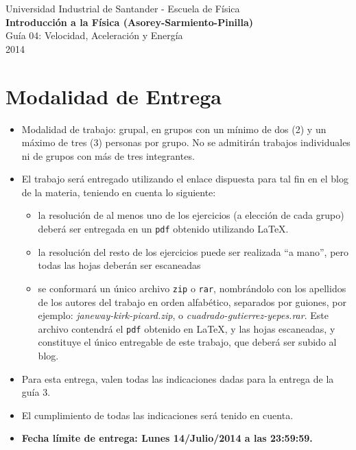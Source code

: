 \documentclass[a4paper,12pt]{article}
\begin{document}
\begin{center}
  {\small{Universidad Industrial de Santander - Escuela de Física}}\\
  {\bf{Introducción a la Física (Asorey-Sarmiento-Pinilla)}}\\
  \vspace{0.4cm}
  Guía 04: Velocidad, Aceleración y Energía\\ 2014
\end{center}

\renewcommand{\labelenumi}{\arabic{enumi})}
\renewcommand{\labelenumii}{\arabic{enumii})}

\section*{Modalidad de Entrega}

\begin{itemize}
\item Modalidad de trabajo: grupal, en grupos con un mínimo de dos (2) y un máximo de tres (3) personas por grupo. No se admitirán trabajos individuales ni de grupos con más de tres integrantes. 
\item El trabajo será entregado utilizando el enlace dispuesta para tal fin en el blog de la materia, teniendo en cuenta lo siguiente:
\begin{itemize}
  \item la resolución de al menos uno de los ejercicios (a elección de cada grupo) deberá ser entregada en un \texttt{pdf} obtenido utilizando \LaTeX.
  \item la resolución del resto de los ejercicios puede ser realizada ``a mano'', pero todas las hojas deberán ser escaneadas
  \item se conformará un único archivo \texttt{zip} o \texttt{rar}, nombrándolo con los apellidos de los autores del trabajo en orden alfabético, separados por guiones, por ejemplo: \textit{janeway-kirk-picard.zip}, o \textit{cuadrado-gutierrez-yepes.rar}. Este archivo contendrá el \texttt{pdf} obtenido en \LaTeX, y las hojas escaneadas, y constituye el único entregable de este trabajo, que deberá ser subido al blog.
\end{itemize}
\item Para esta entrega, valen todas las indicaciones dadas para la entrega de la guía 3.
\item El cumplimiento de todas las indicaciones será tenido en cuenta.
\item {\Large{\bf{Fecha límite de entrega: Lunes 14/Julio/2014 a las 23:59:59.}}}
\end{itemize}
\end{document}

